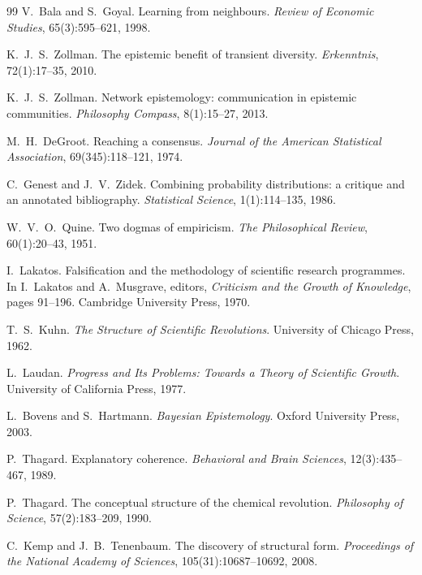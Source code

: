 \documentclass[runningheads]{llncs}
\begin{document}
\clearpage
\begin{thebibliography}{99}
V.~Bala and S.~Goyal.
Learning from neighbours. \emph{Review of Economic Studies}, 65(3):595--621, 1998.

K.~J.~S.~Zollman.
The epistemic benefit of transient diversity. \emph{Erkenntnis}, 72(1):17--35, 2010.

K.~J.~S.~Zollman.
Network epistemology: communication in epistemic communities.
\emph{Philosophy Compass}, 8(1):15--27, 2013.

M.~H.~DeGroot.
Reaching a consensus. \emph{Journal of the American Statistical Association}, 69(345):118--121, 1974.

C.~Genest and J.~V.~Zidek.
Combining probability distributions: a critique and an annotated bibliography.
\emph{Statistical Science}, 1(1):114--135, 1986.

W.~V.~O.~Quine.
Two dogmas of empiricism.
\emph{The Philosophical Review}, 60(1):20--43, 1951.

I.~Lakatos.
Falsification and the methodology of scientific research programmes.
In I.~Lakatos and A.~Musgrave, editors, \emph{Criticism and the Growth of Knowledge},
pages 91--196. Cambridge University Press, 1970.

T.~S.~Kuhn.
\emph{The Structure of Scientific Revolutions}. University of Chicago Press, 1962.

L.~Laudan.
\emph{Progress and Its Problems: Towards a Theory of Scientific Growth}.
University of California Press, 1977.

L.~Bovens and S.~Hartmann.
\emph{Bayesian Epistemology}. Oxford University Press, 2003.

P.~Thagard.
Explanatory coherence. \emph{Behavioral and Brain Sciences}, 12(3):435--467, 1989.

P.~Thagard.
The conceptual structure of the chemical revolution.
\emph{Philosophy of Science}, 57(2):183--209, 1990.

C.~Kemp and J.~B.~Tenenbaum.
The discovery of structural form.
\emph{Proceedings of the National Academy of Sciences}, 105(31):10687--10692, 2008.


\end{thebibliography}
\end{document}
